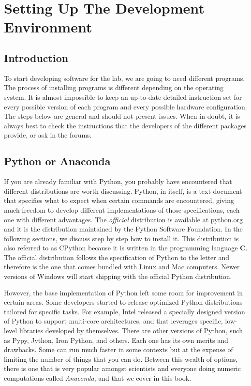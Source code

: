 \chapter{Setting Up The Development Environment}\label{ch:setting-up}
\section{Introduction}\label{sec:setting-up-introduction}
To start developing software for the lab, we are going to need different programs. The process of installing programs is different depending on the operating system. It is almost impossible to keep an up-to-date detailed instruction set for every possible version of each program and every possible hardware configuration. The steps below are general and should not present issues. When in doubt, it is always best to check the instructions that the developers of the different packages provide, or ask in the forums.

\section{Python or Anaconda}\label{sec:python-or-anaconda}
If you are already familiar with Python, you probably have encountered that different distributions are worth discussing. Python, in itself, is a text document that specifies what to expect when certain commands are encountered, giving much freedom to develop different implementations of those specifications, each one with different advantages. The \emph{official} distribution is available at python.org and it is the distribution maintained by the Python Software Foundation. In the following sections, we discuss step by step how to install it. This distribution is also referred to as CPython because it is written in the programming language \textbf{C}. The official distribution follows the specification of Python to the letter and therefore is the one that comes bundled with Linux and Mac computers. Newer versions of Windows will start shipping with the official Python distribution.

However, the base implementation of Python left some room for improvement in certain areas. Some developers started to release optimized Python distributions tailored for specific tasks. For example, Intel released a specially designed version of Python to support multi-core architectures, and that leverages specific, low-level libraries developed by themselves. There are other versions of Python, such as Pypy, Jython, Iron Python, and others. Each one has its own merits and drawbacks. Some can run much faster in some contexts but at the expense of limiting the number of things that you can do. Between this wealth of options, there is one that is very popular amongst scientists and everyone doing numeric computations called \emph{Anaconda}, and that we cover in this book.

